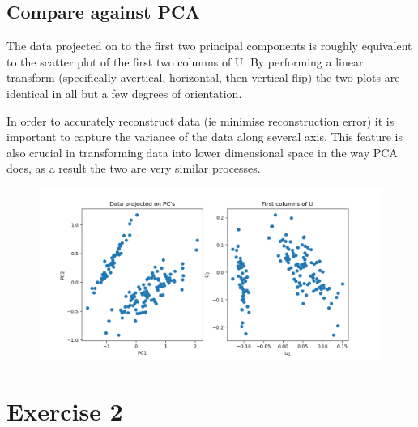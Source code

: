 \documentclass[sigconf]{acmart}
\begin{document}
\subsection{Compare against PCA}
The data projected on to the first two principal components is roughly equivalent to the scatter plot of the first two columns of U.
By performing a linear transform (specifically avertical, horizontal, then vertical flip) the two plots are identical in all but a few degrees of orientation.

In order to accurately reconstruct data (ie minimise reconstruction error) it is important to capture the variance of the data along several axis. This feature is also crucial in transforming data into lower dimensional space in the way PCA does, as a result the two are very similar processes.

\begin{figure}[H]
    \includegraphics[width=\linewidth]{../pcacomparison.png}
\end{figure}

\section{Exercise 2}
\end{document}
